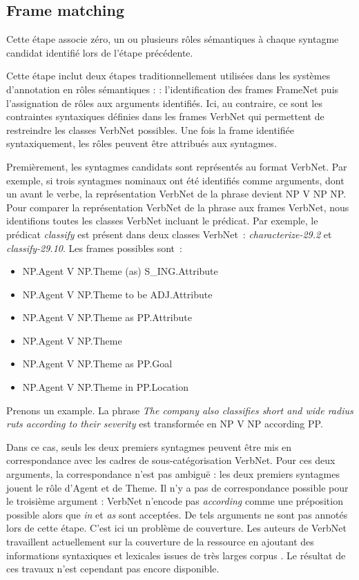 \subsection{Frame matching}

Cette étape associe zéro, un ou plusieurs rôles sémantiques à chaque syntagme
candidat identifié lors de l'étape précédente.

Cette étape inclut deux étapes traditionnellement utilisées dans les systèmes
d'annotation en rôles sémantiques : \citep{gildea2002automatic,das2014frame} :
l'identification des frames FrameNet puis l'assignation de rôles aux arguments
identifiés. Ici, au contraire, ce sont les contraintes syntaxiques définies
dans les frames VerbNet qui permettent de restreindre les classes VerbNet
possibles. Une fois la frame identifiée syntaxiquement, les rôles peuvent être
attribués aux syntagmes.

Premièrement, les syntagmes candidats sont représentés au format VerbNet. Par
exemple, si trois syntagmes nominaux ont été identifiés comme arguments, dont
un avant le verbe, la représentation VerbNet de la phrase devient NP V NP NP.
Pour comparer la représentation VerbNet de la phrase aux frames VerbNet, nous
identifions toutes les classes VerbNet incluant le prédicat. Par exemple, le
prédicat \textit{classify} est présent dans deux classes VerbNet~:
\textit{characterize-29.2} et \textit{classify-29.10}. Les frames possibles
sont~:

\begin{itemize}
    \item NP.Agent V NP.Theme (as) S\_ING.Attribute
    \item NP.Agent V NP.Theme to be ADJ.Attribute
    \item NP.Agent V NP.Theme as PP.Attribute
    \item NP.Agent V NP.Theme
    \item NP.Agent V NP.Theme as PP.Goal
    \item NP.Agent V NP.Theme in PP.Location
\end{itemize}

Prenons un example. La phrase \emph{The company also classifies short and wide
radius ruts according to their severity} est transformée en NP V NP according
PP.

Dans ce cas, seuls les deux premiers syntagmes peuvent être mis en
correspondance avec les cadres de sous-catégorisation VerbNet. Pour ces deux
arguments, la correspondance n'est pas ambiguë : les deux premiers syntagmes
jouent le rôle d'Agent et de Theme. Il n'y a pas de correspondance possible
pour le troisième argument : VerbNet n'encode pas \emph{according} comme une
préposition possible alors que \emph{in} et \emph{as} sont acceptées. De tels
arguments ne sont pas annotés lors de cette étape. C'est ici un problème de
couverture. Les auteurs de VerbNet travaillent actuellement sur la couverture
de la ressource en ajoutant des informations syntaxiques et lexicales issues de
très larges corpus \citep{bonial2013expanding}. Le résultat de ces travaux
n'est cependant pas encore disponible.

